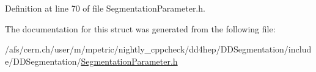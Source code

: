 Definition at line 70 of file SegmentationParameter.h.

The documentation for this struct was generated from the following file:\begin{DoxyCompactItemize}
\item 
/afs/cern.ch/user/m/mpetric/nightly\_\-cppcheck/dd4hep/DDSegmentation/include/DDSegmentation/\hyperlink{_segmentation_parameter_8h}{SegmentationParameter.h}\end{DoxyCompactItemize}
